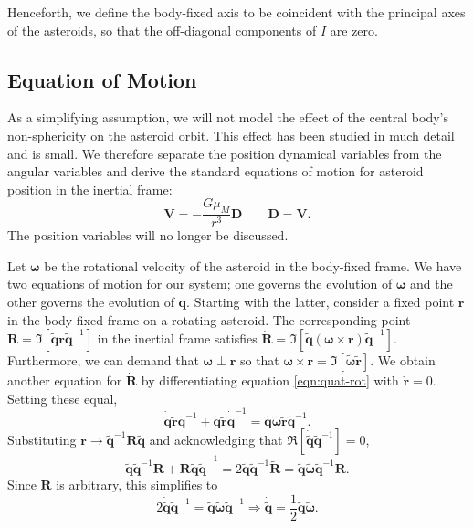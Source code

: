 \documentclass{aastex631}
\newcommand{\quat}[1]{\widetilde{\mathbf{#1}}}
\begin{document}
Henceforth, we define the body-fixed axis to be coincident with the principal axes of the asteroids, so that the off-diagonal components of $I$ are zero.

\subsection{Equation of Motion}
As a simplifying assumption, we will not model the effect of the central body's non-sphericity on the asteroid orbit. This effect has been studied in much detail and is small. We therefore separate the position dynamical variables from the angular variables and derive the standard equations of motion for asteroid position in the inertial frame:
\begin{equation}
\dot{\mathbf{V}} = -\frac{G\mu_M}{r^3}\mathbf{D}\qquad \dot{\mathbf{D}} = \mathbf{V}.
\label{eqn:translaton-eom}
\end{equation}
The position variables will no longer be discussed.

Let $\mathbf\omega$ be the rotational velocity of the asteroid in the body-fixed frame. We have two equations of motion for our system; one governs the evolution of $\mathbf \omega$ and the other governs the evolution of $\mathbf q$. Starting with the latter, consider a fixed point $\mathbf r$ in the body-fixed frame on a rotating asteroid. The corresponding point $\mathbf R=\Im[\quat q \mathbf r \quat q^{-1}]$ in the inertial frame satisfies $\dot{\mathbf R} = \Im[\quat q(\mathbf \omega \times \mathbf r )\quat q^{-1}]$. Furthermore, we can demand that $\mathbf \omega \perp \mathbf r$ so that $\mathbf \omega \times \mathbf r = \Im[\quat \omega \quat r]$. We obtain another equation for $\dot{\mathbf R}$ by differentiating equation \ref{eqn:quat-rot} with $\dot{\mathbf r} = 0$. Setting these equal,
\begin{equation}
\dot{\quat q} \quat r \quat q^{-1} + \quat q \quat r \dot{\quat q}^{-1} = \quat q\quat \omega \quat r \quat q^{-1}.
\nonumber
\end{equation}
Substituting $\mathbf r \rightarrow \quat q^{-1}\mathbf R \quat q$ and acknowledging that $\Re[\dot{\quat q} \quat q^{-1}] = 0$,
\begin{equation}
  \dot{\quat q} \quat q^{-1}\mathbf R + \mathbf R \quat q \dot{\quat q}^{-1} = 2\dot{\quat q}\quat q^{-1}\quat R = \quat q\quat \omega \quat q^{-1}\mathbf R.
\nonumber
\end{equation}
Since $\mathbf R$ is arbitrary, this simplifies to
\begin{equation}
  2\dot{\quat q}\quat q^{-1} =  \quat q\quat \omega \quat q^{-1} \Rightarrow \dot{\quat q} = \frac{1}{2}\quat q\quat \omega.
\label{eqn:quat-eom}
\end{equation}
\end{document}
